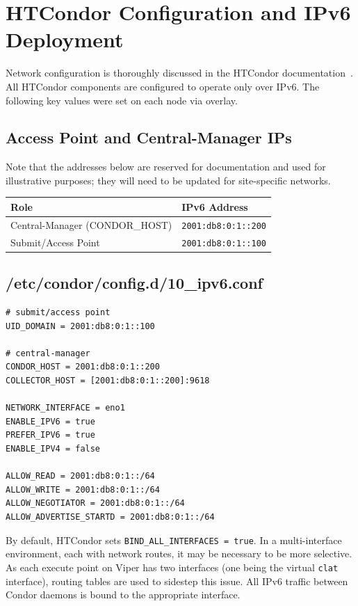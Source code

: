 \documentclass[11pt]{article}
\begin{document}
\section{HTCondor Configuration and IPv6 Deployment}
Network configuration is thoroughly discussed in the HTCondor documentation~\cite{htcondor-ipv6}. All HTCondor components are configured to operate only over IPv6. The following key values were set on each node via overlay.

\subsection{Access Point and Central-Manager IPs}
Note that the addresses below are reserved for documentation and used for illustrative purposes; they will need to be updated for site-specific networks.  
\begin{center}
\small
\begin{tabular}{|l|l|}
\hline
\textbf{Role} & \textbf{IPv6 Address} \\
\hline
Central-Manager (CONDOR\_HOST) & \texttt{2001:db8:0:1::200} \\
Submit/Access Point & \texttt{2001:db8:0:1::100} \\
\hline
\end{tabular}
\end{center}

\subsection{/etc/condor/config.d/10\_ipv6.conf}
\begin{lstlisting}[caption={IPv6 Override Settings}, label={lst:ipv6-conf}]
# submit/access point
UID_DOMAIN = 2001:db8:0:1::100

# central-manager
CONDOR_HOST = 2001:db8:0:1::200
COLLECTOR_HOST = [2001:db8:0:1::200]:9618

NETWORK_INTERFACE = eno1
ENABLE_IPV6 = true
PREFER_IPV6 = true
ENABLE_IPV4 = false

ALLOW_READ = 2001:db8:0:1::/64
ALLOW_WRITE = 2001:db8:0:1::/64
ALLOW_NEGOTIATOR = 2001:db8:0:1::/64
ALLOW_ADVERTISE_STARTD = 2001:db8:0:1::/64
\end{lstlisting}

By default, HTCondor sets \texttt{BIND\_ALL\_INTERFACES = true}. In a multi-interface environment, each with network routes, it may be necessary to be more selective. As each execute point on Viper has two interfaces (one being the virtual \texttt{clat} interface), routing tables are used to sidestep this issue. All IPv6 traffic between Condor daemons is bound to the appropriate interface.  
\end{document}
